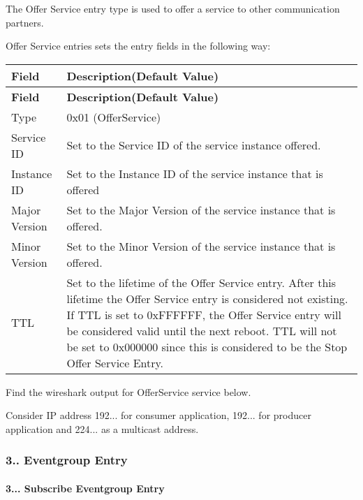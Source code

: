 \begin{DoxyItemize}
\item The Offer Service entry type is used to offer a service to other communication partners.
\item Offer Service entries sets the entry fields in the following way\+: \tabulinesep=1mm
\begin{longtabu} spread 0pt [c]{*{2}{|X[-1]}|}
\hline
\rowcolor{\tableheadbgcolor}\textbf{ Field }&\textbf{ Description(\+Default Value)  }\\
\endfirsthead
\hline
\endfoot
\hline
\rowcolor{\tableheadbgcolor}\textbf{ Field }&\textbf{ Description(\+Default Value)  }\\
\endhead
Type &0x01 (Offer\+Service) \\
Service ID &Set to the Service ID of the service instance offered. \\
Instance ID &Set to the Instance ID of the service instance that is offered \\
Major Version &Set to the Major Version of the service instance that is offered. \\
Minor Version &Set to the Minor Version of the service instance that is offered. \\
T\+TL &Set to the lifetime of the Offer Service entry. After this lifetime the Offer Service entry is considered not existing. If T\+TL is set to 0x\+F\+F\+F\+F\+FF, the Offer Service entry will be considered valid until the next reboot. T\+TL will not be set to 0x000000 since this is considered to be the Stop Offer Service Entry. \\
\end{longtabu}

\item Find the wireshark output for Offer\+Service service below.
\item Consider IP address 192... for consumer application, 192... for producer application and 224... as a multicast address.
\end{DoxyItemize}

 \subsubsection*{3.. Eventgroup Entry}

\paragraph*{3... Subscribe Eventgroup Entry}


